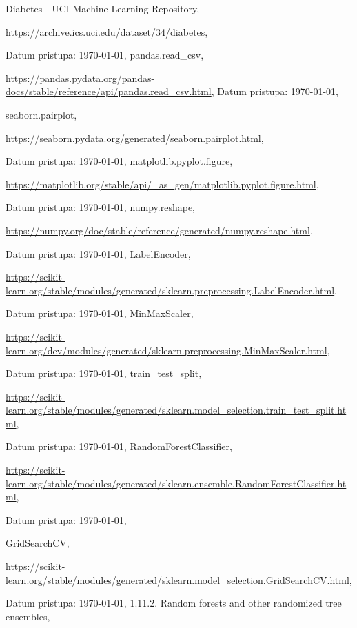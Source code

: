 \documentclass[fontsize=12bp, paper=a4]{scrarticle}
\begin{document}
\begin{thebibliography}{1}
    Diabetes - UCI Machine Learning Repository,

    \url{https://archive.ics.uci.edu/dataset/34/diabetes},

    Datum pristupa: \today,
    pandas.read\_csv,

    \url{https://pandas.pydata.org/pandas-docs/stable/reference/api/pandas.read_csv.html}, Datum pristupa: \today,

    seaborn.pairplot,

    \url{https://seaborn.pydata.org/generated/seaborn.pairplot.html},

    Datum pristupa: \today,
    matplotlib.pyplot.figure,

    \url{https://matplotlib.org/stable/api/_as_gen/matplotlib.pyplot.figure.html},

    Datum pristupa: \today,
    numpy.reshape,

    \url{https://numpy.org/doc/stable/reference/generated/numpy.reshape.html},

    Datum pristupa: \today,
    LabelEncoder,

    \url{https://scikit-learn.org/stable/modules/generated/sklearn.preprocessing.LabelEncoder.html},

    Datum pristupa: \today,
    MinMaxScaler,

    \url{https://scikit-learn.org/dev/modules/generated/sklearn.preprocessing.MinMaxScaler.html},

    Datum pristupa: \today,
    train\_test\_split,

    \url{https://scikit-learn.org/stable/modules/generated/sklearn.model_selection.train_test_split.html},

    Datum pristupa: \today,
    RandomForestClassifier,

    \url{https://scikit-learn.org/stable/modules/generated/sklearn.ensemble.RandomForestClassifier.html},

    Datum pristupa: \today,

    GridSearchCV,

    \url{https://scikit-learn.org/stable/modules/generated/sklearn.model_selection.GridSearchCV.html},

    Datum pristupa: \today,
    1.11.2. Random forests and other randomized tree ensembles, 
    

\end{thebibliography}
\end{document}

